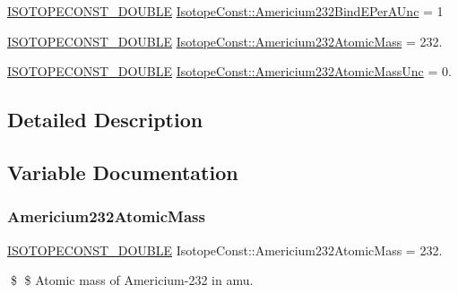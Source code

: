 \begin{DoxyCompactItemize}
\mbox{\hyperlink{group___isotope_const-_macros_ga8f45a7272ce02c0b4c65c44636ed719a}{I\+S\+O\+T\+O\+P\+E\+C\+O\+N\+S\+T\+\_\+\+D\+O\+U\+B\+LE}} \mbox{\hyperlink{group___isotope_const-_americium-_am232_gac6701e3f358d3d7538eec590bd9d462a}{Isotope\+Const\+::\+Americium232\+Bind\+E\+Per\+A\+Unc}} = 1
\item 
\mbox{\hyperlink{group___isotope_const-_macros_ga8f45a7272ce02c0b4c65c44636ed719a}{I\+S\+O\+T\+O\+P\+E\+C\+O\+N\+S\+T\+\_\+\+D\+O\+U\+B\+LE}} \mbox{\hyperlink{group___isotope_const-_americium-_am232_ga646027ce5524b3b7ebec7d67727f7e85}{Isotope\+Const\+::\+Americium232\+Atomic\+Mass}} = 232.
\item 
\mbox{\hyperlink{group___isotope_const-_macros_ga8f45a7272ce02c0b4c65c44636ed719a}{I\+S\+O\+T\+O\+P\+E\+C\+O\+N\+S\+T\+\_\+\+D\+O\+U\+B\+LE}} \mbox{\hyperlink{group___isotope_const-_americium-_am232_gab9488be38bb0b86507841f3fe7934bda}{Isotope\+Const\+::\+Americium232\+Atomic\+Mass\+Unc}} = 0.
\end{DoxyCompactItemize}


\subsection{Detailed Description}


\subsection{Variable Documentation}
\mbox{\label{group___isotope_const-_americium-_am232_ga646027ce5524b3b7ebec7d67727f7e85}} 
\subsubsection{\texorpdfstring{Americium232\+Atomic\+Mass}{Americium232AtomicMass}}
{\footnotesize\ttfamily \mbox{\hyperlink{group___isotope_const-_macros_ga8f45a7272ce02c0b4c65c44636ed719a}{I\+S\+O\+T\+O\+P\+E\+C\+O\+N\+S\+T\+\_\+\+D\+O\+U\+B\+LE}} Isotope\+Const\+::\+Americium232\+Atomic\+Mass = 232.}

\$ \$ Atomic mass of Americium-\/232 in amu. \mbox{\label{group___isotope_const-_americium-_am232_gab9488be38bb0b86507841f3fe7934bda}} 
